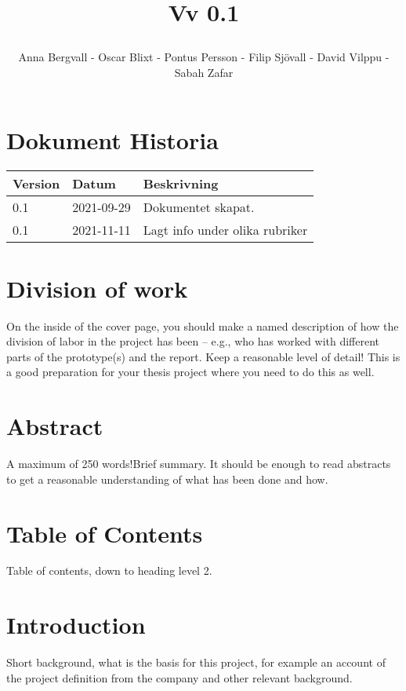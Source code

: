 \documentclass[12pt]{article}
\date {#1}
\title {
    \documentNumber {01}    

    \documentTitle {Helsingborg Event and Convention Bureau}
    
    \documentDate {2021-09-29}
    \documentVersion Vv 0.1
    
    \author{Anna Bergvall - Oscar Blixt - Pontus Persson - Filip Sjövall - David Vilppu - Sabah Zafar }
}
\begin{document}
\maketitle

\thispagestyle{empty}



\newpage

\tableofcontents


\newpage

\section{Dokument Historia}
\begin{tabular}{ l | l | l }
    Version & Datum & Beskrivning \\
    \hline
    0.1 & 2021-09-29 & Dokumentet skapat. \\
    \hline
     0.1 & 2021-11-11 & Lagt info under olika rubriker \\
     \hline
   
   
\end{tabular}

\newpage

\section{Division of work}
On the inside of the cover page, you should make a named description of how the division of labor in the project has been – e.g., who has worked with different parts of the prototype(s) and the report. Keep a reasonable level of detail! This is a good preparation for your thesis project where you need to do this as well.

\section{Abstract}
A maximum of 250 words!Brief summary. It should be enough to read abstracts to get a reasonable understanding of what has been done and how.

\section{Table of Contents}
Table of contents, down to heading level 2.

\section{Introduction}
Short background, what is the basis for this project, for example an account of the project definition from the company and other relevant background.
\end{document}
